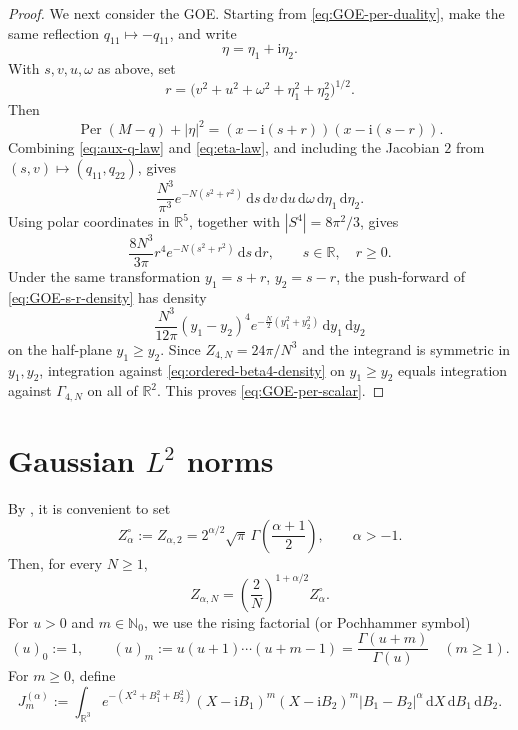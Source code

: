 \documentclass[11pt,reqno]{amsart}
\numberwithin{equation}{section}
\theoremstyle{definition}
\theoremstyle{remark}
\DeclareMathOperator{\Per}{Per}
\newcommand{\R}{\mathbb R}
\newcommand{\1}{\mathbf 1}
\newcommand{\dd}{\mathrm d}
\newcommand{\ii}{\mathrm i}
\begin{document}
\begin{proof}
We next consider the GOE.  Starting from \eqref{eq:GOE-per-duality}, make
the same reflection \(q_{11}\mapsto-q_{11}\), and write
\[
  \eta=\eta_1+\ii\eta_2.
\]
With \(s,v,u,\omega\) as above, set
\[
  r=
  \bigl(v^2+u^2+\omega^2+\eta_1^2+\eta_2^2\bigr)^{1/2}.
\]
Then
\[
  \Per(M-q)+|\eta|^2
  =
  (x-\ii(s+r))(x-\ii(s-r)).
\]
Combining \eqref{eq:aux-q-law} and \eqref{eq:eta-law}, and including the
Jacobian \(2\) from \((s,v)\mapsto(q_{11},q_{22})\), gives
\[
  \frac{N^3}{\pi^3}e^{-N(s^2+r^2)}
  \,\dd s\,\dd v\,\dd u\,\dd\omega\,\dd\eta_1\,\dd\eta_2.
\]
Using polar coordinates in \(\R^5\), together with
\(|S^4|=8\pi^2/3\), gives
\begin{equation}\label{eq:GOE-s-r-density}
  \frac{8N^3}{3\pi}r^4e^{-N(s^2+r^2)}\,\dd s\,\dd r,
  \qquad s\in\R,\quad r\ge0.
\end{equation}
Under the same transformation \(y_1=s+r\), \(y_2=s-r\), the push-forward
of \eqref{eq:GOE-s-r-density} has density
\begin{equation}\label{eq:ordered-beta4-density}
  \frac{N^3}{12\pi}(y_1-y_2)^4
  e^{-\frac N2(y_1^2+y_2^2)}\,\dd y_1\,\dd y_2
\end{equation}
on the half-plane \(y_1\ge y_2\).  Since \(Z_{4,N}=24\pi/N^3\) and the
integrand is symmetric in \(y_1,y_2\), integration against
\eqref{eq:ordered-beta4-density} on \(y_1\ge y_2\) equals integration
against \(\Gamma_{4,N}\) on all of \(\R^2\).  This proves
\eqref{eq:GOE-per-scalar}.

 
\end{proof}

\section{Gaussian \texorpdfstring{$L^2$}{L2} norms}

By , it is convenient to set
\begin{equation}\label{eq:Z-alpha-base}
  Z_\alpha^\circ
  :=
  Z_{\alpha,2}
  =
  2^{\alpha/2}\sqrt\pi\,
  \Gamma\!\left(\frac{\alpha+1}{2}\right),
  \qquad \alpha>-1.
\end{equation}
Then, for every \(N\ge1\),
\begin{equation}\label{eq:Z-alpha-N-value}
  Z_{\alpha,N}
  =
  \left(\frac2N\right)^{1+\alpha/2}Z_\alpha^\circ.
\end{equation}
For \(u>0\) and \(m\in\mathbb N_0\), we use the rising factorial
(or Pochhammer symbol)
\[
  (u)_0:=1,
  \qquad
  (u)_m:=u(u+1)\cdots(u+m-1)
  =\frac{\Gamma(u+m)}{\Gamma(u)}
  \quad(m\ge1).
\]
For \(m\ge0\), define
\begin{equation}\label{eq:J-alpha-m}
  J_m^{(\alpha)}
  :=
  \int_{\R^3}
  e^{-(X^2+B_1^2+B_2^2)}
  (X-\ii B_1)^m(X-\ii B_2)^m
  |B_1-B_2|^\alpha
  \,\dd X\,\dd B_1\,\dd B_2.
\end{equation}
\end{document}
